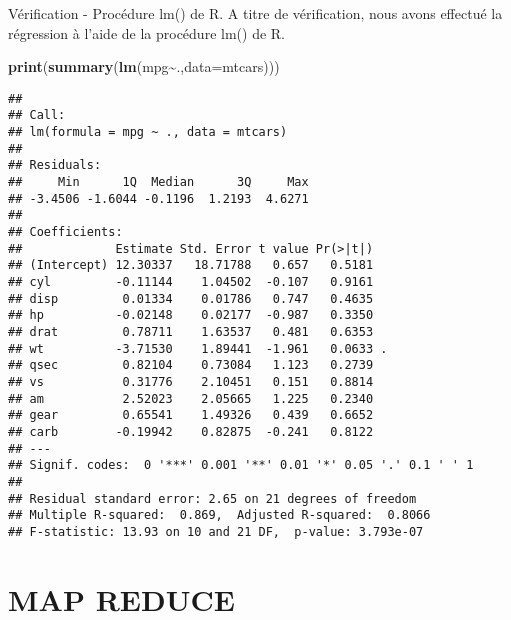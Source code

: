 \documentclass[
]{article}
\newenvironment{Shaded}{\begin{snugshade}}{\end{snugshade}}
\newcommand{\AttributeTok}[1]{\textcolor[rgb]{0.13,0.29,0.53}{#1}}
\newcommand{\FunctionTok}[1]{\textcolor[rgb]{0.13,0.29,0.53}{\textbf{#1}}}
\newcommand{\NormalTok}[1]{#1}
\newcommand{\SpecialCharTok}[1]{\textcolor[rgb]{0.81,0.36,0.00}{\textbf{#1}}}
\begin{document}
Vérification - Procédure lm() de R. A titre de vérification, nous avons
effectué la régression à l'aide de la procédure lm() de R.

\begin{Shaded}
\begin{Highlighting}[]
\FunctionTok{print}\NormalTok{(}\FunctionTok{summary}\NormalTok{(}\FunctionTok{lm}\NormalTok{(mpg}\SpecialCharTok{\textasciitilde{}}\NormalTok{.,}\AttributeTok{data=}\NormalTok{mtcars)))}
\end{Highlighting}
\end{Shaded}

\begin{verbatim}
## 
## Call:
## lm(formula = mpg ~ ., data = mtcars)
## 
## Residuals:
##     Min      1Q  Median      3Q     Max 
## -3.4506 -1.6044 -0.1196  1.2193  4.6271 
## 
## Coefficients:
##             Estimate Std. Error t value Pr(>|t|)  
## (Intercept) 12.30337   18.71788   0.657   0.5181  
## cyl         -0.11144    1.04502  -0.107   0.9161  
## disp         0.01334    0.01786   0.747   0.4635  
## hp          -0.02148    0.02177  -0.987   0.3350  
## drat         0.78711    1.63537   0.481   0.6353  
## wt          -3.71530    1.89441  -1.961   0.0633 .
## qsec         0.82104    0.73084   1.123   0.2739  
## vs           0.31776    2.10451   0.151   0.8814  
## am           2.52023    2.05665   1.225   0.2340  
## gear         0.65541    1.49326   0.439   0.6652  
## carb        -0.19942    0.82875  -0.241   0.8122  
## ---
## Signif. codes:  0 '***' 0.001 '**' 0.01 '*' 0.05 '.' 0.1 ' ' 1
## 
## Residual standard error: 2.65 on 21 degrees of freedom
## Multiple R-squared:  0.869,  Adjusted R-squared:  0.8066 
## F-statistic: 13.93 on 10 and 21 DF,  p-value: 3.793e-07
\end{verbatim}

\hypertarget{map-reduce}{%
\section{MAP REDUCE}\label{map-reduce}}
\end{document}
